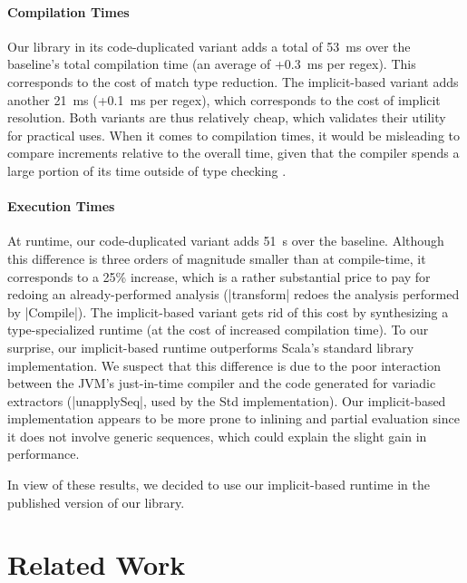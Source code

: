 \paragraph{Compilation Times} Our library in its code-duplicated variant adds a total of 53~ms over the baseline's total compilation time (an average of +0.3~ms per regex).
This corresponds to the cost of match type reduction.
The implicit-based variant adds another 21~ms (+0.1~ms per regex), which corresponds to the cost of implicit resolution.
Both variants are thus relatively cheap, which validates their utility for practical uses.
When it comes to compilation times, it would be misleading to compare increments relative to the overall time, given that the compiler spends a large portion of its time outside of type checking \citep[§ 2.11.3]{petrashko2017design}.

\paragraph{Execution Times} At runtime, our code-duplicated variant adds 51~\textmu s over the baseline.
Although this difference is three orders of magnitude smaller than at compile-time, it corresponds to a 25\% increase, which is a rather substantial price to pay for redoing an already-performed analysis (|transform| redoes the analysis performed by |Compile|).
The implicit-based variant gets rid of this cost by synthesizing a type-specialized runtime (at the cost of increased compilation time).
To our surprise, our implicit-based runtime outperforms Scala's standard library implementation.
We suspect that this difference is due to the poor interaction between the JVM's just-in-time compiler and the code generated for variadic extractors (|unapplySeq|, used by the Std implementation).
Our implicit-based implementation appears to be more prone to inlining and partial evaluation since it does not involve generic sequences, which could explain the slight gain in performance.

\bigskip

In view of these results, we decided to use our implicit-based runtime in the published version of our library.

\section{Related Work}
\label{sec:related}

